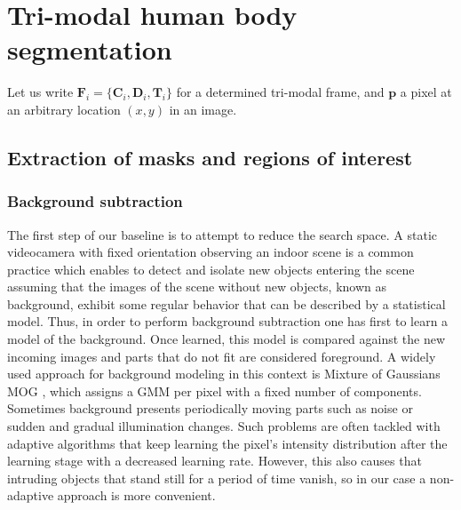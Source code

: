 \documentclass[10pt,twocolumn,letterpaper]{article}
\begin{document}
\section{Tri-modal human body segmentation}
\label{sec:trimodalhumanbodysegmentation}

Let us write $\mathbf{F}_i = \{\mathbf{C}_i, \mathbf{D}_i, \mathbf{T}_i\}$ for a determined tri-modal frame, and $\mathbf{p}$ a pixel at an arbitrary location $(x,y)$ in an image.

\subsection{Extraction of masks and regions of interest} 
\label{ssec:bsbb}


\subsubsection{Background subtraction}\label{sect:bs}
The first step of our baseline is to attempt to reduce the search space. A static videocamera with fixed orientation observing an indoor scene is a common practice which enables to detect and isolate new objects entering the scene assuming that the images of the scene without new objects, known as background, exhibit some regular behavior that can be described by a statistical model. Thus, in order to perform background subtraction one has first to learn a model of the background. Once learned, this model is compared against the new incoming images and parts that do not fit are considered foreground. A widely used approach for background modeling in this context is Mixture of Gaussians MOG  \cite{bouwmans2008background}, which assigns a GMM per pixel with a fixed number of components. Sometimes background presents periodically moving parts such as noise or sudden and gradual illumination changes. Such problems are often tackled with adaptive algorithms that keep learning the pixel's intensity distribution after the learning stage with a decreased learning rate. However, this also causes that intruding objects that stand still for a period of time vanish, so in our case a non-adaptive approach is more convenient.
\end{document}

